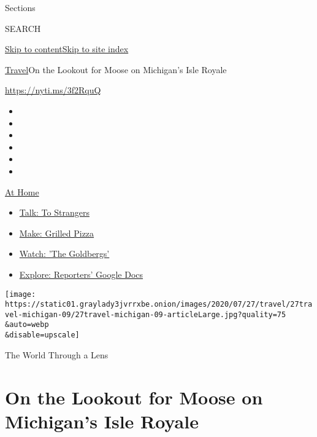 Sections

SEARCH

\protect\hyperlink{site-content}{Skip to
content}\protect\hyperlink{site-index}{Skip to site index}

\href{/section/travel}{Travel}\textbar{}On the Lookout for Moose on
Michigan's Isle Royale

\url{https://nyti.ms/3f2RquQ}

\begin{itemize}
\item
\item
\item
\item
\item
\item
\end{itemize}

\href{https://www.nytimes3xbfgragh.onion/spotlight/at-home?action=click\&pgtype=Article\&state=default\&region=TOP_BANNER\&context=at_home_menu}{At
Home}

\begin{itemize}
\tightlist
\item
  \href{https://www.nytimes3xbfgragh.onion/2020/08/03/well/family/the-benefits-of-talking-to-strangers.html?action=click\&pgtype=Article\&state=default\&region=TOP_BANNER\&context=at_home_menu}{Talk:
  To Strangers}
\item
  \href{https://www.nytimes3xbfgragh.onion/2020/08/01/at-home/coronavirus-make-pizza-on-a-grill.html?action=click\&pgtype=Article\&state=default\&region=TOP_BANNER\&context=at_home_menu}{Make:
  Grilled Pizza}
\item
  \href{https://www.nytimes3xbfgragh.onion/2020/07/31/arts/television/goldbergs-abc-stream.html?action=click\&pgtype=Article\&state=default\&region=TOP_BANNER\&context=at_home_menu}{Watch:
  'The Goldbergs'}
\item
  \href{https://www.nytimes3xbfgragh.onion/interactive/2020/at-home/even-more-reporters-editors-diaries-lists-recommendations.html?action=click\&pgtype=Article\&state=default\&region=TOP_BANNER\&context=at_home_menu}{Explore:
  Reporters' Google Docs}
\end{itemize}

\texttt{[image: https://static01.graylady3jvrrxbe.onion/images/2020/07/27/travel/27travel-michigan-09/27travel-michigan-09-articleLarge.jpg?quality=75\\\&auto=webp\\\&disable=upscale]}

The World Through a Lens

\hypertarget{on-the-lookout-for-moose-on-michigans-isle-royale}{%
\section{On the Lookout for Moose on Michigan's Isle
Royale}\label{on-the-lookout-for-moose-on-michigans-isle-royale}}

